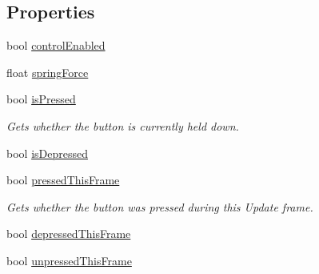 \subsection*{Properties}
\begin{DoxyCompactItemize}
\item 
bool \mbox{\hyperlink{class_leap_1_1_unity_1_1_interaction_1_1_interaction_button_ad25616c2095b92d6abf00c501fead38f}{control\+Enabled}}
\item 
float \mbox{\hyperlink{class_leap_1_1_unity_1_1_interaction_1_1_interaction_button_a35b7556091789e87ea79f1e814049c9a}{spring\+Force}}
\item 
bool \mbox{\hyperlink{class_leap_1_1_unity_1_1_interaction_1_1_interaction_button_a21de162442ba3672aa091ccaab86c890}{is\+Pressed}}
\begin{DoxyCompactList}\small\item\em Gets whether the button is currently held down. \end{DoxyCompactList}\item 
bool \mbox{\hyperlink{class_leap_1_1_unity_1_1_interaction_1_1_interaction_button_a7e4fe8e6be6991bd8b6547ab7766474e}{is\+Depressed}}
\item 
bool \mbox{\hyperlink{class_leap_1_1_unity_1_1_interaction_1_1_interaction_button_ad9f5e7c4373f864d20166bbc438f957a}{pressed\+This\+Frame}}
\begin{DoxyCompactList}\small\item\em Gets whether the button was pressed during this Update frame. \end{DoxyCompactList}\item 
bool \mbox{\hyperlink{class_leap_1_1_unity_1_1_interaction_1_1_interaction_button_a19c6b223af10d8d681199bc9e5089c5a}{depressed\+This\+Frame}}
\item 
bool \mbox{\hyperlink{class_leap_1_1_unity_1_1_interaction_1_1_interaction_button_a94cfc9c5194195303d76e0bbdf19d269}{unpressed\+This\+Frame}}

\end{DoxyCompactItemize}
